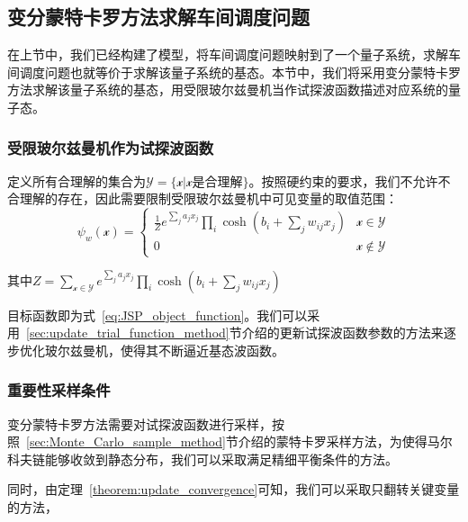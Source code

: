 \section{变分蒙特卡罗方法求解车间调度问题}
在上节中，我们已经构建了模型，将车间调度问题映射到了一个量子系统，求解车间调度问题也就等价于求解该量子系统的基态。本节中，我们将采用变分蒙特卡罗方法求解该量子系统的基态，用受限玻尔兹曼机当作试探波函数描述对应系统的量子态。
\subsection{受限玻尔兹曼机作为试探波函数}
定义所有合理解的集合为$\mathscr{Y}=\{\mathcal{x}|\mathcal{x}\text{是合理解}\}$。按照硬约束的要求，我们不允许不合理解的存在，因此需要限制受限玻尔兹曼机中可见变量的取值范围：
\begin{equation}
    \psi_{w}(\mathcal{x})=\begin{cases} \frac{1}{Z}e^{\sum_{j} a_{j} x_{j}} \prod_{i} \cosh \left(b_{i}+\sum_{j} w_{i j} x_{j}\right) & \mathcal{x}\in\mathscr{Y} \\ 0 & \mathcal{x}\notin\mathscr{Y} \end{cases}
\end{equation}

其中$Z=\sum\limits_{\mathcal{x}\in\mathscr{Y}}e^{\sum_{j} a_{j} x_{j}} \prod_{i} \cosh \left(b_{i}+\sum_{j} w_{i j} x_{j}\right)$

目标函数即为式~\eqref{eq:JSP_object_function}。我们可以采用~\ref{sec:update_trial_function_method}节介绍的更新试探波函数参数的方法来逐步优化玻尔兹曼机，使得其不断逼近基态波函数。
\subsection{重要性采样条件}
变分蒙特卡罗方法需要对试探波函数进行采样，按照~\ref{sec:Monte_Carlo_sample_method}节介绍的蒙特卡罗采样方法，为使得马尔科夫链能够收敛到静态分布，我们可以采取满足精细平衡条件的方法。

同时，由定理~\ref{theorem:update_convergence}可知，我们可以采取只翻转关键变量的方法，



\chapter{}
